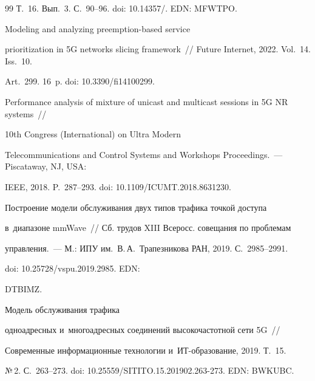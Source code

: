 {{\begin{thebibliography}{99}
Т.~16. Вып.~3. С.~90--96. doi: 10.14357\!/. EDN: MFWTPO.




 Modeling and analyzing preemption-based service 

prioritization in 5G networks slicing framework~/\!\!/ Future Internet, 2022. Vol.~14. Iss.~10. 

Art.~299. 16~p. doi: 10.3390\!/\!fi14100299.





Performance analysis of mixture of unicast and multicast sessions in 5G NR systems~/\!\!/ 

10th Congress (International) on Ultra Modern 

Telecommunications and Control Systems and Workshops Proceedings.~--- Piscataway, NJ, USA: 

IEEE, 2018. P.~287--293. doi: 10.1109\!/\!ICUMT.2018.8631230.


 Построение модели обслуживания двух типов трафика точкой доступа 

в~диапазоне mmWave~/\!\!/ Сб. трудов XIII Всеросс. совещания по проблемам  

управ\-ле\-ния.~--- М.: ИПУ им.\ В.\,А.~Трапезникова РАН, 2019. С.~2985--2991.

doi: 10.25728\!/\!vspu.2019.2985. EDN: 

DTBIMZ.






 Модель обслуживания трафика 

одноадресных и~многоадресных со\-еди\-не\-ний высокочастотной сети 5G~/\!\!/ 

Современные информационные технологии и~ИТ-об\-ра\-зо\-ва\-ние, 2019. Т.~15. 

№\,2. С.~263--273. doi: 10.25559\!/\!SITITO.15.201902.263-273. EDN: BWKUBC.




\end{thebibliography}}}
